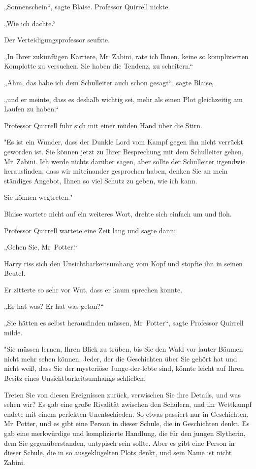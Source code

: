 {„Sonnenschein“, sagte Blaise. Professor Quirrell nickte.

„Wie ich dachte.“

Der Verteidigungsprofessor seufzte.

„In Ihrer zukünftigen Karriere, Mr~Zabini, rate ich Ihnen, keine so komplizierten Komplotte zu versuchen. Sie haben die Tendenz, zu scheitern.“

„Ähm, das habe ich dem Schulleiter auch schon gesagt“, sagte Blaise,

„und er meinte, dass es deshalb wichtig sei, mehr als einen Plot gleichzeitig am Laufen zu haben.“

Professor Quirrell fuhr sich mit einer müden Hand über die Stirn.

"Es ist ein Wunder, dass der Dunkle Lord vom Kampf gegen ihn nicht verrückt geworden ist. Sie können jetzt zu Ihrer Besprechung mit dem Schulleiter gehen, Mr~Zabini. Ich werde nichts darüber sagen, aber sollte der Schulleiter irgendwie herausfinden, dass wir miteinander gesprochen haben, denken Sie an mein ständiges Angebot, Ihnen so viel Schutz zu geben, wie ich kann.

Sie können wegtreten."

Blaise wartete nicht auf ein weiteres Wort, drehte sich einfach um und floh.

Professor Quirrell wartete eine Zeit lang und sagte dann:

„Gehen Sie, Mr~Potter.“

Harry riss sich den Unsichtbarkeitsumhang vom Kopf und stopfte ihn in seinen Beutel.

Er zitterte so sehr vor Wut, dass er kaum sprechen konnte.

„Er hat was? Er hat was getan?“

„Sie hätten es selbst herausfinden müssen, Mr~Potter“, sagte Professor Quirrell milde.

"Sie müssen lernen, Ihren Blick zu trüben, bis Sie den Wald vor lauter Bäumen nicht mehr sehen können. Jeder, der die Geschichten über Sie gehört hat und nicht weiß, dass Sie der mysteriöse Junge-der-lebte sind, könnte leicht auf Ihren Besitz eines Unsichtbarkeitsumhangs schließen.

Treten Sie von diesen Ereignissen zurück, verwischen Sie ihre Details, und was sehen wir? Es gab eine große Rivalität zwischen den Schülern, und ihr Wettkampf endete mit einem perfekten Unentschieden. So etwas passiert nur in Geschichten, Mr~Potter, und es gibt eine Person in dieser Schule, die in Geschichten denkt. Es gab eine merkwürdige und komplizierte Handlung, die für den jungen Slytherin, dem Sie gegenüberstanden, untypisch sein sollte. Aber es gibt eine Person in dieser Schule, die in so ausgeklügelten Plots denkt, und sein Name ist nicht Zabini.

}
